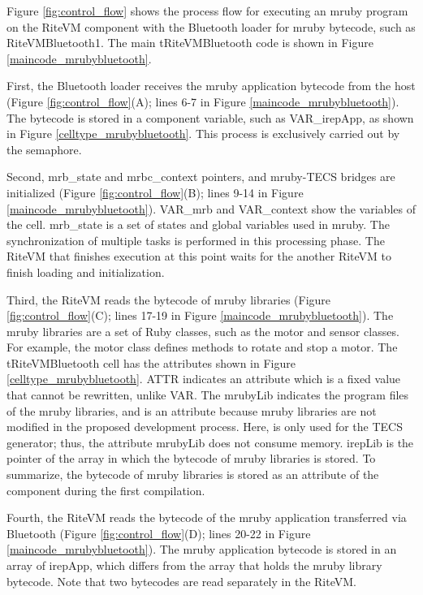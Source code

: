 \documentclass{sig-alternate-05-2015}
\begin{document}
Figure \ref{fig:control_flow} shows the process flow for executing an mruby program on the RiteVM component with the Bluetooth loader for mruby bytecode, such as RiteVMBluetooth1.
The main tRiteVMBluetooth code is shown in Figure \ref{maincode_mrubybluetooth}.

First, the Bluetooth loader receives the mruby application bytecode from the host (Figure \ref{fig:control_flow}(A); lines 6-7 in Figure \ref{maincode_mrubybluetooth}).
The bytecode is stored in a component variable, such as {\myit VAR\_irepApp}, as shown in Figure \ref{celltype_mrubybluetooth}.
This process is exclusively carried out by the semaphore.

Second, {\myit mrb\_state} and {\myit mrbc\_context} pointers, and mruby-TECS bridges are initialized (Figure \ref{fig:control_flow}(B); lines 9-14 in Figure \ref{maincode_mrubybluetooth}).
{\myit VAR\_mrb} and {\myit VAR\_context} show the variables of the {\myit cell}.
{\myit mrb\_state} is a set of states and global variables used in mruby.
The synchronization of multiple tasks is performed in this processing phase.
The RiteVM that finishes execution at this point waits for the another RiteVM to finish loading and initialization.

Third, the RiteVM reads the bytecode of mruby libraries (Figure \ref{fig:control_flow}(C); lines 17-19 in Figure \ref{maincode_mrubybluetooth}).
The mruby libraries are a set of Ruby classes, such as the motor and sensor classes.
For example, the motor class defines methods to rotate and stop a motor.
The tRiteVMBluetooth {\myit cell} has the attributes shown in Figure \ref{celltype_mrubybluetooth}.
{\myit ATTR} indicates an attribute which is a fixed value that cannot be rewritten, unlike {\myit VAR}.
The {\myit mrubyLib} indicates the program files of the mruby libraries, and is an attribute because mruby libraries are not modified in the proposed development process.
Here, {\myit [omit]} is only used for the TECS generator; thus, the attribute {\myit mrubyLib} does not consume memory.
{\myit irepLib} is the pointer of the array in which the bytecode of mruby libraries is stored.
To summarize, the bytecode of mruby libraries is stored as an attribute of the component during the first compilation.

Fourth, the RiteVM reads the bytecode of the mruby application transferred via Bluetooth (Figure \ref{fig:control_flow}(D); lines 20-22 in Figure \ref{maincode_mrubybluetooth}).
The mruby application bytecode is stored in an array of {\myit irepApp}, which differs from the array that holds the mruby library bytecode.
Note that two bytecodes are read separately in the RiteVM.
\end{document}
